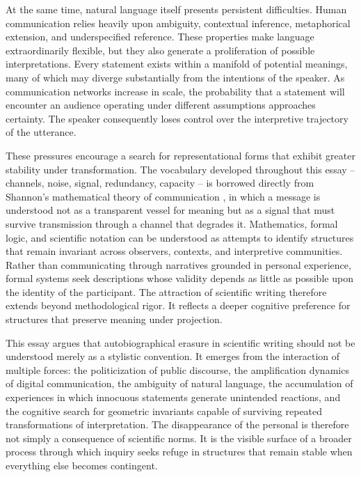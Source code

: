 \documentclass[11pt]{article}
\theoremstyle{plain}
\begin{document}
At the same time, natural language itself presents persistent difficulties. Human communication relies heavily upon ambiguity, contextual inference, metaphorical extension, and underspecified reference. These properties make language extraordinarily flexible, but they also generate a proliferation of possible interpretations. Every statement exists within a manifold of potential meanings, many of which may diverge substantially from the intentions of the speaker. As communication networks increase in scale, the probability that a statement will encounter an audience operating under different assumptions approaches certainty. The speaker consequently loses control over the interpretive trajectory of the utterance.

These pressures encourage a search for representational forms that exhibit greater stability under transformation. The vocabulary developed throughout this essay -- channels, noise, signal, redundancy, capacity -- is borrowed directly from Shannon's mathematical theory of communication \cite{shannon1948}, in which a message is understood not as a transparent vessel for meaning but as a signal that must survive transmission through a channel that degrades it. Mathematics, formal logic, and scientific notation can be understood as attempts to identify structures that remain invariant across observers, contexts, and interpretive communities. Rather than communicating through narratives grounded in personal experience, formal systems seek descriptions whose validity depends as little as possible upon the identity of the participant. The attraction of scientific writing therefore extends beyond methodological rigor. It reflects a deeper cognitive preference for structures that preserve meaning under projection.

This essay argues that autobiographical erasure in scientific writing should not be understood merely as a stylistic convention. It emerges from the interaction of multiple forces: the politicization of public discourse, the amplification dynamics of digital communication, the ambiguity of natural language, the accumulation of experiences in which innocuous statements generate unintended reactions, and the cognitive search for geometric invariants capable of surviving repeated transformations of interpretation. The disappearance of the personal is therefore not simply a consequence of scientific norms. It is the visible surface of a broader process through which inquiry seeks refuge in structures that remain stable when everything else becomes contingent.
\end{document}
